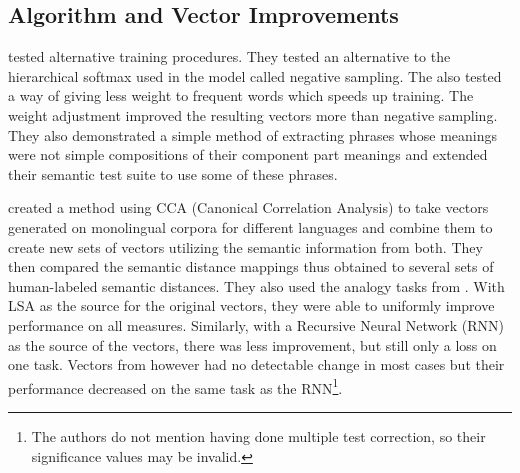 \subsection{Algorithm and Vector Improvements}

\citep{Mikolov2013c} tested alternative training procedures. They tested an 
alternative to the hierarchical softmax used in the \modelname{} model called 
negative 
sampling. The also tested a way of giving less weight to frequent words
which speeds up training. The weight adjustment improved the resulting vectors
more than negative sampling. They also demonstrated a simple method
of extracting phrases whose meanings were not simple compositions of their
component part meanings and extended their semantic test suite to use some
of these phrases.

\citep{Faruqui2014} created a method using CCA (Canonical Correlation Analysis) 
to take vectors generated on
monolingual corpora for different languages and combine them to create new sets
of vectors utilizing the semantic information from both. They then compared the
semantic distance mappings thus obtained to several sets of human-labeled 
semantic distances. They also used the analogy tasks from \citep{Mikolov2013a}.
With LSA as the source for the original vectors, they were
able to uniformly improve performance on all measures. Similarly, with a
Recursive Neural Network (RNN) as the source of the vectors, there was less
improvement, but still only a loss on one task. Vectors from \modelname{} 
however had no detectable change in most cases but their performance decreased
on the same task as the RNN\footnote{The authors do not mention having done
multiple test correction, so their significance values may be invalid.}.

